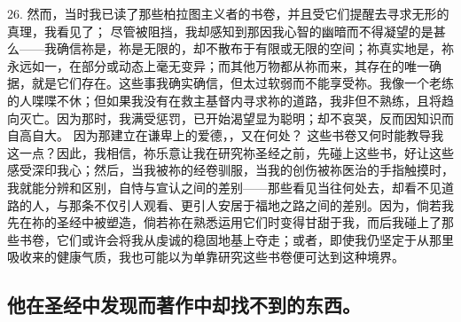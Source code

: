 26. 然而，当时我已读了那些柏拉图主义者的书卷，并且受它们提醒去寻求无形的真理，我看见了； 尽管被阻挡，我却感知到那因我心智的幽暗而不得凝望的是甚么——我确信祢是，祢是无限的，却不散布于有限或无限的空间；祢真实地是，祢永远如一，在部分或动态上毫无变异；而其他万物都从祢而来，其存在的唯一确据，就是它们存在。这些事我确实确信，但太过软弱而不能享受祢。我像一个老练的人喋喋不休；但如果我没有在救主基督内寻求祢的道路，我非但不熟练，且将趋向灭亡。因为那时，我满受惩罚，已开始渴望显为聪明；却不哀哭，反而因知识而自高自大。 因为那建立在谦卑上的爱德，，又在何处？ 这些书卷又何时能教导我这一点？因此，我相信，祢乐意让我在研究祢圣经之前，先碰上这些书，好让这些感受深印我心；然后，当我被祢的经卷驯服，当我的创伤被祢医治的手指触摸时，我就能分辨和区别，自恃与宣认之间的差别——那些看见当往何处去，却看不见道路的人，与那条不仅引人观看、更引人安居于福地之路之间的差别。因为，倘若我先在祢的圣经中被塑造，倘若祢在熟悉运用它们时变得甘甜于我，而后我碰上了那些书卷，它们或许会将我从虔诚的稳固地基上夺走；或者，即使我仍坚定于从那里吸收来的健康气质，我也可能以为单靠研究这些书卷便可达到这种境界。\par


\subsection{他在圣经中发现而著作中却找不到的东西。}

